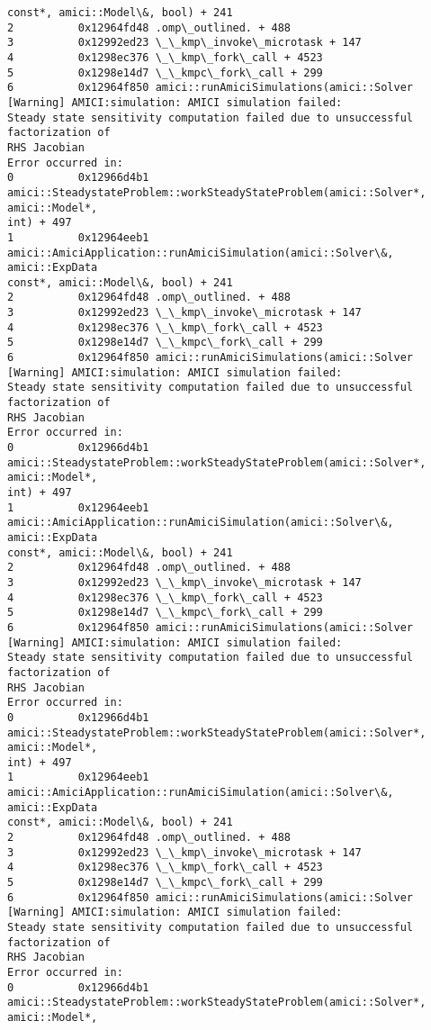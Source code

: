 \documentclass[11pt]{article}
\begin{document}
\begin{Verbatim}[commandchars=\\\{\}]
const*, amici::Model\&, bool) + 241
2          0x12964fd48 .omp\_outlined. + 488
3          0x12992ed23 \_\_kmp\_invoke\_microtask + 147
4          0x1298ec376 \_\_kmp\_fork\_call + 4523
5          0x1298e14d7 \_\_kmpc\_fork\_call + 299
6          0x12964f850 amici::runAmiciSimulations(amici::Solver
[Warning] AMICI:simulation: AMICI simulation failed:
Steady state sensitivity computation failed due to unsuccessful factorization of
RHS Jacobian
Error occurred in:
0          0x12966d4b1
amici::SteadystateProblem::workSteadyStateProblem(amici::Solver*, amici::Model*,
int) + 497
1          0x12964eeb1
amici::AmiciApplication::runAmiciSimulation(amici::Solver\&, amici::ExpData
const*, amici::Model\&, bool) + 241
2          0x12964fd48 .omp\_outlined. + 488
3          0x12992ed23 \_\_kmp\_invoke\_microtask + 147
4          0x1298ec376 \_\_kmp\_fork\_call + 4523
5          0x1298e14d7 \_\_kmpc\_fork\_call + 299
6          0x12964f850 amici::runAmiciSimulations(amici::Solver
[Warning] AMICI:simulation: AMICI simulation failed:
Steady state sensitivity computation failed due to unsuccessful factorization of
RHS Jacobian
Error occurred in:
0          0x12966d4b1
amici::SteadystateProblem::workSteadyStateProblem(amici::Solver*, amici::Model*,
int) + 497
1          0x12964eeb1
amici::AmiciApplication::runAmiciSimulation(amici::Solver\&, amici::ExpData
const*, amici::Model\&, bool) + 241
2          0x12964fd48 .omp\_outlined. + 488
3          0x12992ed23 \_\_kmp\_invoke\_microtask + 147
4          0x1298ec376 \_\_kmp\_fork\_call + 4523
5          0x1298e14d7 \_\_kmpc\_fork\_call + 299
6          0x12964f850 amici::runAmiciSimulations(amici::Solver
[Warning] AMICI:simulation: AMICI simulation failed:
Steady state sensitivity computation failed due to unsuccessful factorization of
RHS Jacobian
Error occurred in:
0          0x12966d4b1
amici::SteadystateProblem::workSteadyStateProblem(amici::Solver*, amici::Model*,
int) + 497
1          0x12964eeb1
amici::AmiciApplication::runAmiciSimulation(amici::Solver\&, amici::ExpData
const*, amici::Model\&, bool) + 241
2          0x12964fd48 .omp\_outlined. + 488
3          0x12992ed23 \_\_kmp\_invoke\_microtask + 147
4          0x1298ec376 \_\_kmp\_fork\_call + 4523
5          0x1298e14d7 \_\_kmpc\_fork\_call + 299
6          0x12964f850 amici::runAmiciSimulations(amici::Solver
[Warning] AMICI:simulation: AMICI simulation failed:
Steady state sensitivity computation failed due to unsuccessful factorization of
RHS Jacobian
Error occurred in:
0          0x12966d4b1
amici::SteadystateProblem::workSteadyStateProblem(amici::Solver*, amici::Model*,

\end{Verbatim}
\end{document}
